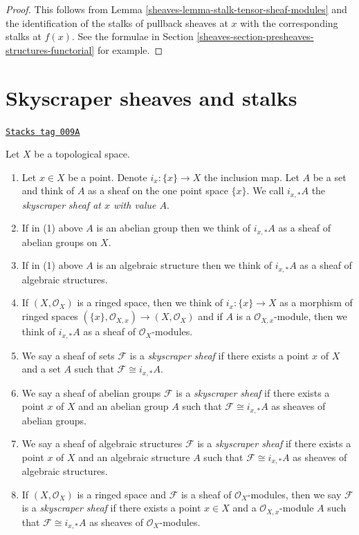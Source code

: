\begin{proof}

This follows from Lemma \ref{sheaves-lemma-stalk-tensor-sheaf-modules}
and the identification of the stalks of pullback sheaves
at $x$ with the corresponding stalks at $f(x)$. See the
formulae in Section \ref{sheaves-section-presheaves-structures-functorial}
for example.
\end{proof}

\section{Skyscraper sheaves and stalks}
\label{sheaves-section-skyscraper-sheaves}
\begin{definition}
\label{sheaves-definition-skyscraper-sheaf}
\href{https://stacks.math.columbia.edu/tag/009A}{\texttt{Stacks tag 009A}}

Let $X$ be a topological space.
\begin{enumerate}
\item Let $x \in X$ be a point. Denote $i_x : \{x\} \to X$ the inclusion map.
Let $A$ be a set and think of $A$ as a sheaf on the one point space $\{x\}$.
We call $i_{x, *}A$ the {\it skyscraper sheaf at $x$ with value $A$}.
\item If in (1) above $A$ is an abelian group then we think of
$i_{x, *}A$ as a sheaf of abelian groups on $X$.
\item If in (1) above $A$ is an algebraic structure then we think
of $i_{x, *}A$ as a sheaf of algebraic structures.
\item If $(X, \mathcal{O}_X)$ is a ringed space, then we think
of $i_x : \{x\} \to X$ as a morphism of ringed spaces
$(\{x\}, \mathcal{O}_{X, x}) \to (X, \mathcal{O}_X)$
and if $A$ is a $\mathcal{O}_{X, x}$-module, then we think
of $i_{x, *}A$ as a sheaf of $\mathcal{O}_X$-modules.
\item We say a sheaf of sets $\mathcal{F}$ is a {\it skyscraper sheaf}
if there exists a point $x$ of $X$ and a set $A$ such
that $\mathcal{F} \cong i_{x, *}A$.
\item We say a sheaf of abelian groups $\mathcal{F}$ is a
{\it skyscraper sheaf} if there exists a point $x$ of $X$
and an abelian group $A$ such that $\mathcal{F} \cong i_{x, *}A$
as sheaves of abelian groups.
\item We say a sheaf of algebraic structures $\mathcal{F}$ is a
{\it skyscraper sheaf} if there exists a point $x$ of $X$
and an algebraic structure $A$ such that $\mathcal{F} \cong i_{x, *}A$
as sheaves of algebraic structures.
\item If $(X, \mathcal{O}_X)$ is a ringed space and
$\mathcal{F}$ is a sheaf of $\mathcal{O}_X$-modules, then
we say $\mathcal{F}$ is a {\it skyscraper sheaf} if there
exists a point $x \in X$ and a $\mathcal{O}_{X, x}$-module
$A$ such that $\mathcal{F} \cong i_{x, *}A$
as sheaves of $\mathcal{O}_X$-modules.
\end{enumerate}
\end{definition}

